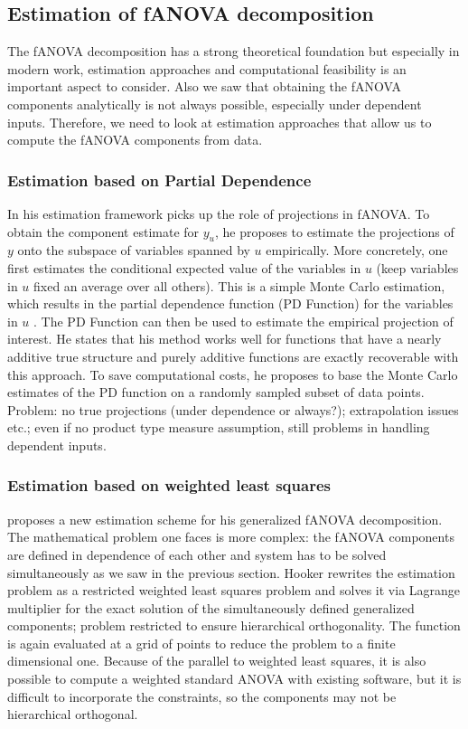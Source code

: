 \subsection{Estimation of fANOVA decomposition}
The fANOVA decomposition has a strong theoretical foundation but especially in modern work, estimation approaches and computational feasibility is an important aspect to consider.
Also we saw that obtaining the fANOVA components analytically is not always possible, especially under dependent inputs. Therefore, we need to look at estimation approaches that allow us to compute the fANOVA components from data.

\subsubsection*{Estimation based on Partial Dependence}
In his estimation framework \cite{hooker2004} picks up the role of projections in fANOVA. To obtain the component estimate for $y_u$, he proposes to estimate the projections of $y$ onto the subspace of variables spanned by $u$ empirically.
More concretely, one first estimates the conditional expected value of the variables in $u$ (keep variables in $u$ fixed an average over all others). This is a simple Monte Carlo estimation, which results in the partial dependence function (PD Function) for the variables in $u$ \citep{hooker2004}.
The PD Function can then be used to estimate the empirical projection of interest. He states that his method works well for functions that have a nearly additive true structure and purely additive functions are exactly recoverable with this approach. To save computational costs, he proposes to base the Monte Carlo estimates of the PD function on a randomly sampled subset of data points.
Problem: no true projections (under dependence or always?); extrapolation issues etc.; even if no product type measure assumption, still problems in handling dependent inputs.

\subsubsection*{Estimation based on weighted least squares}
\cite{hooker2007} proposes a new estimation scheme for his generalized fANOVA decomposition. The mathematical problem one faces is more complex: the fANOVA components are defined in dependence of each other and system has to be solved simultaneously as we saw in the previous section.
Hooker rewrites the estimation problem as a restricted weighted least squares problem and solves it via Lagrange multiplier for the exact solution of the simultaneously defined generalized components; problem restricted to ensure hierarchical orthogonality.
The function is again evaluated at a grid of points to reduce the problem to a finite dimensional one. 
Because of the parallel to weighted least squares, it is also possible to compute a weighted standard ANOVA with existing software, but it is difficult to incorporate the constraints, so the components may not be hierarchical orthogonal.


